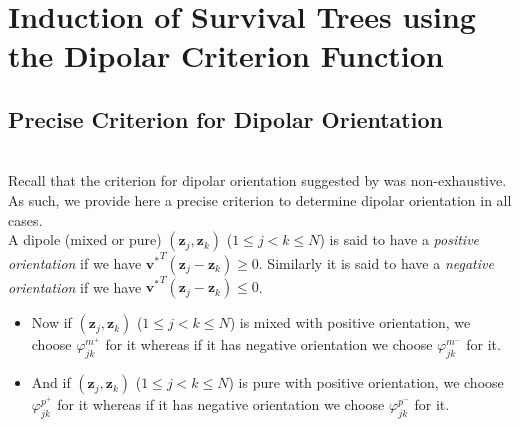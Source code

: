 \documentclass[12pt]{amsart}
\theoremstyle{definition}
\theoremstyle{plain}
\theoremstyle{remark}
\begin{document}
\section{Induction of Survival Trees using the Dipolar Criterion Function}


\subsection{Precise Criterion for Dipolar Orientation} \hfill \\

Recall that the criterion for dipolar orientation suggested by \cite{kretowska} was non-exhaustive. As such, we provide here a precise criterion to determine dipolar orientation in all cases. \\

A dipole (mixed or pure) $(\mathbf{z}_j, \mathbf{z}_k)$ ($1 \leq j < k \leq N$) is said to have a \emph{positive orientation} if we have ${\mathbf{v}^{\ast}}^T (\mathbf{z}_j - \mathbf{z}_k) \geq 0$. Similarly it is said to have a \emph{negative orientation} if we have ${{\mathbf{v}^\ast}}^T (\mathbf{z}_j - \mathbf{z}_k) \leq 0$. \\
	
\begin{itemize}

	\item Now if $(\mathbf{z}_j, \mathbf{z}_k)$ ($1 \leq j < k \leq N$) is mixed with positive orientation, we choose $\varphi^{m^+}_{jk}$ for it whereas if it has negative orientation  we choose $\varphi^{m^-}_{jk}$ for it. \\
	
	\item And if $(\mathbf{z}_j, \mathbf{z}_k)$ ($1 \leq j < k \leq N$) is pure with positive orientation, we choose $\varphi^{p^+}_{jk}$ for it whereas if it has negative orientation  we choose $\varphi^{p^-}_{jk}$ for it. \\
	
\end{itemize}








\end{document}
